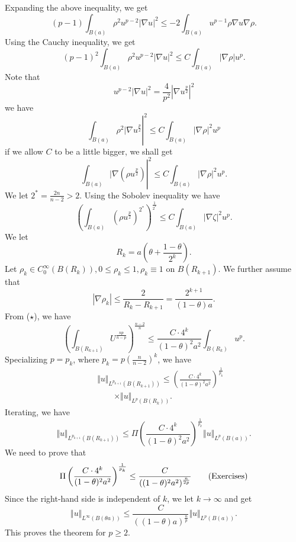 Expanding the above inequality, we get 
%
\[(p-1) \int _{B(a)} \rho^2 u  ^{p -2} | \nabla u|^2 \leq  - 2 \int _{B(a)}  u  ^{p-1} \rho \nabla u \nabla \rho .\]
%
Using the Cauchy inequality, we get 
%
\[(p-1)^2 \int _{B(a)} \rho^2 u  ^{p -2}  | \nabla u|^2 \leq     C \int _{B(a)} |\nabla \rho | u^p.\]
%
Note that 
%
\[  u  ^{p-2}   | \nabla u|^2 = \frac{4}{p^2}   \left|\nabla u  ^{\frac{p}{2}} \right|^2\]
%
we have 
%
\[ 
\left. \int _{B(a)} \rho^2     | \nabla u  ^{\frac{p}{2}} \right|^2   \leq  C   \int _{B(a)}  | \nabla \rho| ^2 u^p \]
%
if we allow $C$ to be a little bigger, we shall get 
%
\[ \left.\int _{B(a)}     | \nabla (\rho u ^{\frac{p}{2}} )\right|^2   \leq  C   \int _{B(a)}  | \nabla \rho| ^2 u^p .\]
%
 We let $ 2^\ast = \frac{2n}{n-2} > 2$. Using the Sobolev inequality we have 
%
\begin{equation} \left(\int _{B(a)}( \rho u    ^{\frac{p}{2}})  ^{2^{\ast}}  \right)   ^{\frac{1}{2^{\ast}}}\leq  C   \int _{B(a)}  | \nabla \zeta |^2 u^p . \tag{$\star$}\end{equation}
%
We let 
%
\[R_k = a \left(\theta + \frac{1-\theta}{2^k}\right). \] 
%
Let $ \rho_k \in C^\infty_0 (B (R_k)) , 0 \leq \rho _k \leq 1, \rho _k \equiv 1 $ on $ B(R_{k+1} )$. We further assume that 
%
\[| \nabla \rho_k| \leq \frac{2}{R_k - R_{k+1}} = \frac{2^{k+1}}{(1-\theta)a}. \]
%
From ($\star$), we have 
\[ \left( \int_{B(R_{k+1})} U ^{\frac{np}{n-p}}\right)^{\frac{n-2}{n}} \leq \frac{C \cdot 4^k}{(1 - \theta )^2 a^2} \int _{B(R_k)} u^p.  \]
%
Specializing $ p = p_k $, where $ p_k = p \left( \frac{n}{n-2} \right) ^k $, we have 
%
\begin{eqnarray*}
&&\Vert u \Vert _{L^{p_{k+1}} (B (R _{k+1} ))} \leq \left ( \frac{C \cdot 4^k}{(1 - \theta )^2 a^2} \right) ^{\frac{1}{p_k}}\\
&& \quad \quad \times  \Vert u \Vert _{L^{p} (B (R _k ))}.
\end{eqnarray*}
Iterating, we have 
%
\[\Vert u \Vert_{L^{p_{k+1}} (B (R _{k+1} ))} \leq \Pi \left ( \frac{C \cdot 4^k}{(1 - \theta )^2 a^2} \right) ^{\frac{1}{p_k}} \Vert u \Vert _{L^{p} (B (a))}.\]
%
We need to prove that 
\begin{equation}\Pi \left ( \frac{C \cdot 4^k}{(1 - \theta )^2 a^2} \right) ^{\frac{1}{p_k}} \leq 
  \frac{C  }{((1 - \theta )^2 a^2)^{\frac{n}{2p}}}   \tag{{\rm Exercises}}\end{equation}
%
Since the right-hand side is independent of $k$, we let $ k \rightarrow \infty $ and get 
%
\[\Vert u \Vert _{L^{\infty} (B (\theta a  ))} \leq  \frac{C  }{((1 - \theta ) a) ^{\frac{n}{p}}}   \Vert u \Vert _{L^{p} (B (a))}.\]
%
This proves the theorem for $ p \geq 2$. 

